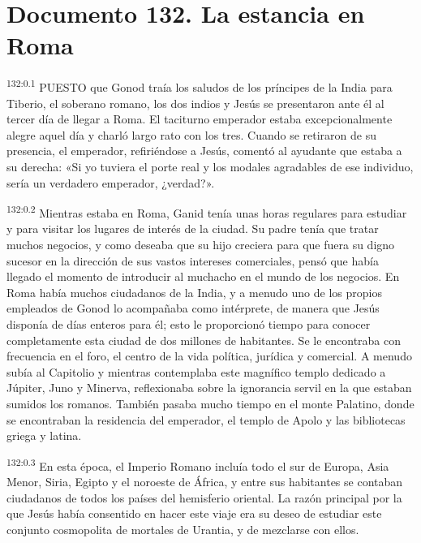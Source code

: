 \chapter{Documento 132. La estancia en Roma}
\par
\textsuperscript{132:0.1} PUESTO que Gonod traía los saludos de los príncipes de la India para Tiberio, el soberano romano, los dos indios y Jesús se presentaron ante él al tercer día de llegar a Roma. El taciturno emperador estaba excepcionalmente alegre aquel día y charló largo rato con los tres. Cuando se retiraron de su presencia, el emperador, refiriéndose a Jesús, comentó al ayudante que estaba a su derecha: «Si yo tuviera el porte real y los modales agradables de ese individuo, sería un verdadero emperador, ¿verdad?».

\par
\textsuperscript{132:0.2} Mientras estaba en Roma, Ganid tenía unas horas regulares para estudiar y para visitar los lugares de interés de la ciudad. Su padre tenía que tratar muchos negocios, y como deseaba que su hijo creciera para que fuera su digno sucesor en la dirección de sus vastos intereses comerciales, pensó que había llegado el momento de introducir al muchacho en el mundo de los negocios. En Roma había muchos ciudadanos de la India, y a menudo uno de los propios empleados de Gonod lo acompañaba como intérprete, de manera que Jesús disponía de días enteros para él; esto le proporcionó tiempo para conocer completamente esta ciudad de dos millones de habitantes. Se le encontraba con frecuencia en el foro, el centro de la vida política, jurídica y comercial. A menudo subía al Capitolio y mientras contemplaba este magnífico templo dedicado a Júpiter, Juno y Minerva, reflexionaba sobre la ignorancia servil en la que estaban sumidos los romanos. También pasaba mucho tiempo en el monte Palatino, donde se encontraban la residencia del emperador, el templo de Apolo y las bibliotecas griega y latina.

\par
\textsuperscript{132:0.3} En esta época, el Imperio Romano incluía todo el sur de Europa, Asia Menor, Siria, Egipto y el noroeste de África, y entre sus habitantes se contaban ciudadanos de todos los países del hemisferio oriental. La razón principal por la que Jesús había consentido en hacer este viaje era su deseo de estudiar este conjunto cosmopolita de mortales de Urantia, y de mezclarse con ellos.

